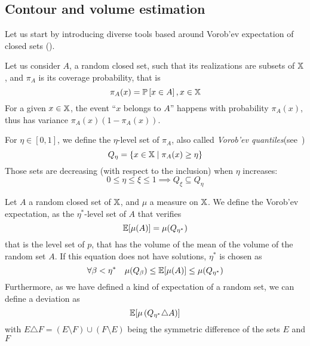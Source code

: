\documentclass[../../Main_ManuscritThese.tex]{subfiles}
\begin{document}
 
\subsection{Contour and volume estimation}
Let us start by introducing diverse tools based around Vorob'ev expectation of closed sets (\cite{el_amri_analyse_2019,heinrich_level_2012,vorobyev_new_2003}). 

Let us consider $A$, a random closed set, such that its realizations are subsets of $\mathbb{X}$, and $\pi_A$ is its coverage probability, that is
\begin{equation}
  \pi_A(x) = \mathbb{P}\left[x\in A\right], x\in\mathbb{X}
\end{equation}
For a given $x\in\mathbb{X}$, the event ``$x$ belongs to $A$'' happens with probability $\pi_A(x)$, thus has variance $\pi_A(x)(1 - \pi_A(x))$.

For $\eta \in [0, 1]$, we define the $\eta$-level set of $\pi_A$, also called \emph{Vorob'ev quantiles}(see~\cite{vorobyev_new_2003})
\begin{equation}
  Q_{\eta} = \{x\in\mathbb{X} \mid \pi_A(x) \geq \eta \}
\end{equation}
Those sets are decreasing (with respect to the inclusion) when $\eta$ increases:
\begin{equation}
  0\leq \eta \leq \xi \leq 1 \implies Q_{\xi} \subseteq Q_{\eta}
\end{equation}

\begin{definition}
  Let $A$ a random closed set of $\mathbb{X}$, and $\mu$ a measure on $\mathbb{X}$. We define the Vorob'ev expectation, as the $\eta^*$-level set of $A$ that verifies
  \begin{equation}
    \mathbb{E}[\mu(A)] = \mu(Q_{\eta^*})
  \end{equation}
  that is the level set of $p$, that has the volume of the mean of the volume of the random set $A$.
  If this equation does not have solutions, $\eta^*$ is chosen as
\begin{equation}
  \forall \beta < \eta^* \quad \mu(Q_{\beta}) \leq \mathbb{E}[\mu(A)] \leq \mu(Q_{\eta^*})
\end{equation}
Furthermore, as we have defined a kind of expectation of a random set, we can define a deviation as
\begin{equation}
  \mathbb{E}[\mu\left(Q_{\eta^*} \triangle A \right)]
\end{equation}
with $E\triangle F = \left(E \setminus F\right) \cup \left(F \setminus E\right)$ being the symmetric difference of the sets $E$ and $F$
\end{definition}
\end{document}
